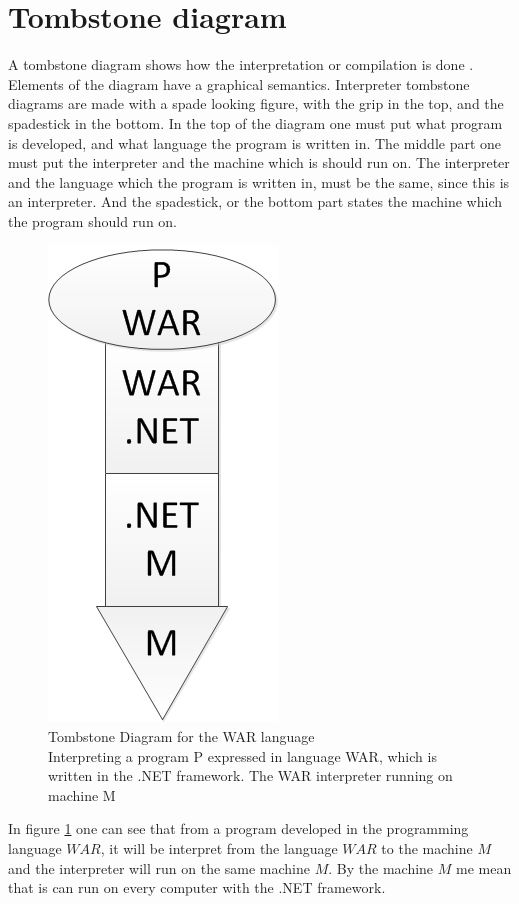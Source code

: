 \section{Tombstone diagram}

A tombstone diagram shows how the interpretation or compilation is done \cite{Tombstone}.
Elements of the diagram have a graphical semantics. 
Interpreter tombstone diagrams are made with a spade looking figure, with the grip in the top, and the spadestick in the bottom. In the top of the diagram one must put what program is developed, and what language the program is written in. The middle part one must put the interpreter and the machine which is should run on. The interpreter and the language which the program is written in, must be the same, since this is an interpreter. And the spadestick, or the bottom part states the machine which the program should run on.

			\begin{figure}
				\centering
				\includegraphics[scale=0.75]{rapport/3/figures/tombstone}
				\caption{Tombstone Diagram for the WAR language\\ Interpreting a program P expressed in language WAR, which is written in the .NET framework. The WAR interpreter running on machine M} \label{fig:tombstone}
			\end{figure}
			
In figure \ref{fig:tombstone} one can see that from a program developed in the programming language $WAR$, it will be interpret from the language $WAR$ to the machine $M$ and the interpreter will run on the same machine $M$. By the machine $M$ me mean that is can run on every computer with the .NET framework.

